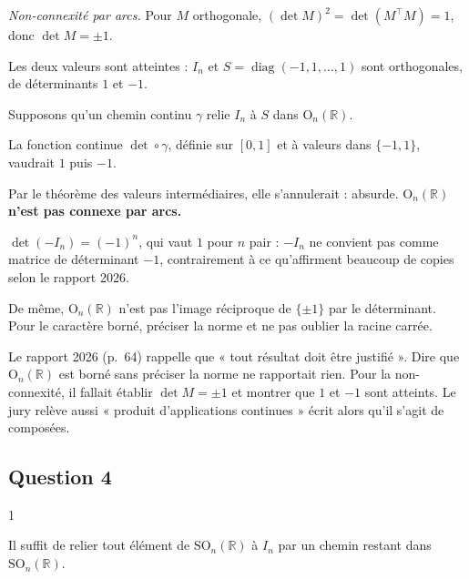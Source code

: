 \documentclass[11pt,a4paper]{article}
\begin{document}
\emph{Non-connexité par arcs.} Pour \(M\) orthogonale, \((\det M)^2=\det(M^\top M)=1\), donc \(\det M=\pm1\).

Les deux valeurs sont atteintes : \(I_n\) et \(S=\operatorname{diag}(-1,1,\dots,1)\) sont orthogonales, de déterminants \(1\) et \(-1\).

Supposons qu'un chemin continu \(\gamma\) relie \(I_n\) à \(S\) dans \({\mathrm{O}}_n(\mathbb{R})\).

La fonction continue \(\det\circ\gamma\), définie sur \([0,1]\) et à valeurs dans \(\{-1,1\}\), vaudrait \(1\) puis \(-1\).

Par le théorème des valeurs intermédiaires, elle s'annulerait : absurde. \textbf{\({\mathrm{O}}_n(\mathbb{R})\) n'est pas connexe par arcs.}

\begin{piege}

\(\det(-I_n)=(-1)^n\), qui vaut \(1\) pour \(n\) pair : \(-I_n\) ne convient pas comme matrice de déterminant \(-1\), contrairement à ce qu'affirment beaucoup de copies selon le rapport 2026.

De même, \({\mathrm{O}}_n(\mathbb{R})\) n'est pas l'image réciproque de \(\{\pm1\}\) par le déterminant. Pour le caractère borné, préciser la norme et ne pas oublier la racine carrée.

\end{piege}

\begin{jury}

Le rapport 2026 (p.~64) rappelle que « tout résultat doit être justifié ». Dire que \({\mathrm{O}}_n(\mathbb{R})\) est borné sans préciser la norme ne rapportait rien. Pour la non-connexité, il fallait établir \(\det M=\pm1\) et montrer que \(1\) et \(-1\) sont atteints. Le jury relève aussi « produit d'applications continues » écrit alors qu'il s'agit de composées.

\end{jury}

\hypertarget{question-4}{%
\subsection{Question 4}\label{question-4}}

\begin{indication}{1}

Il suffit de relier tout élément de \({\mathrm{SO}}_n(\mathbb{R})\) à \(I_n\) par un chemin restant dans \({\mathrm{SO}}_n(\mathbb{R})\).

\end{indication}
\end{document}
